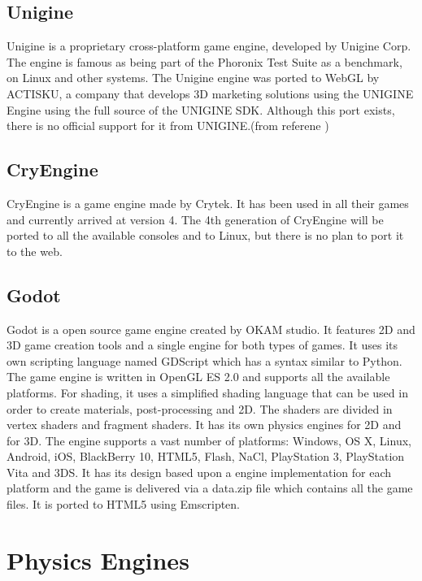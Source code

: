 \subsection{Unigine}

Unigine is a proprietary cross-platform game engine, developed by Unigine Corp. The engine is famous as being part of the Phoronix Test Suite as a benchmark, on Linux and other systems. 
The Unigine engine was ported to WebGL by ACTISKU, a company that develops 3D marketing solutions using the UNIGINE Engine using the full source of the UNIGINE SDK. Although this port exists, there is no official support for it from UNIGINE.(from referene \cite{unigine13})

\subsection{CryEngine}

CryEngine is a game engine made by Crytek. It has been used in all their games and currently arrived at version 4. The 4th generation of CryEngine will be ported to all the available consoles and to Linux, but there is no plan to port it to the web.

\subsection{Godot}

Godot is a open source game engine created by OKAM studio. It features 2D and 3D game creation tools and a single engine for both types of games. It uses its own scripting language named GDScript which has a syntax similar to Python. The game engine is written in OpenGL ES 2.0 and supports all the available platforms. For shading, it uses a simplified shading language that can be used in order to create materials, post-processing and 2D. The shaders are divided in vertex shaders and fragment shaders. It has its own physics engines for 2D and for 3D. The engine supports a vast number of platforms:  Windows, OS X, Linux, Android, iOS, BlackBerry 10, HTML5, Flash, NaCl, PlayStation 3, PlayStation Vita and 3DS. It has its design based upon a engine implementation for each platform and the game is delivered via a data.zip file which contains all the game files. It is ported to HTML5 using Emscripten.

\section{Physics Engines}

